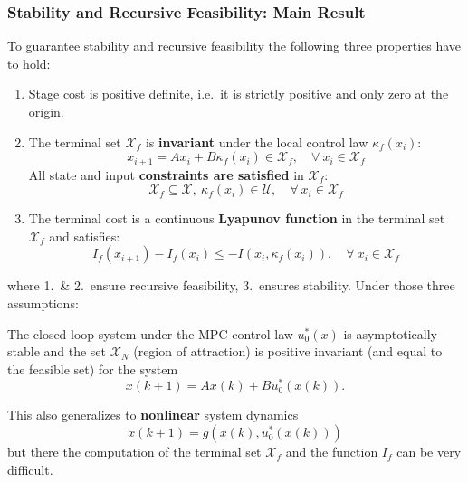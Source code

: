 \subsubsection{Stability and Recursive Feasibility: Main Result}\label{stab_rec_feasibility}
To guarantee stability and recursive feasibility the following three properties have to hold:
\begin{enumerate}
    \item Stage cost is positive definite, i.e.\ it is strictly positive and only zero at the origin.
    \item The terminal set $\mathcal{X}_f$ is \textbf{invariant} under the local control law $\kappa_f(x_i)$:
          \begin{equation*}
              x_{i+1} = Ax_i +B\kappa_f(x_i) \in \mathcal{X}_f, \quad \forall\: x_i \in \mathcal{X}_f
          \end{equation*}
          All state and input \textbf{constraints are satisfied} in $\mathcal{X}_f$:
          \begin{equation*}
              \mathcal{X}_f \subseteq \mathcal{X}, \: \kappa_f(x_i) \in \mathcal{U}, \quad \forall\: x_i \in \mathcal{X}_f
          \end{equation*}
    \item The terminal cost is a continuous \textbf{Lyapunov function} in the terminal set $\mathcal{X}_f$ and satisfies:
          \begin{equation*}
              I_f(x_{i+1})-I_f(x_i) \leq -I(x_i,\kappa_f(x_i)), \quad \forall\: x_i \in \mathcal{X}_f
          \end{equation*}
\end{enumerate}
where 1.\ \& 2.\ ensure recursive feasibility, 3.\ ensures stability.
\newpar{}
Under those three assumptions:

The closed-loop system under the MPC control law $u_0^*(x)$ is asymptotically stable and the set $\mathcal{X}_N$ (region of attraction) is positive invariant (and equal to the feasible set) for the system
\begin{equation*}
    x(k+1) = Ax(k) + Bu_0^*(x(k)).
\end{equation*}

This also generalizes to \textbf{nonlinear} system dynamics
\begin{equation*}
    x(k+1) = g(x(k),u_0^*(x(k)))
\end{equation*}
but there the computation of the terminal set $\mathcal{X}_f$ and the function $I_f$ can be very difficult.

